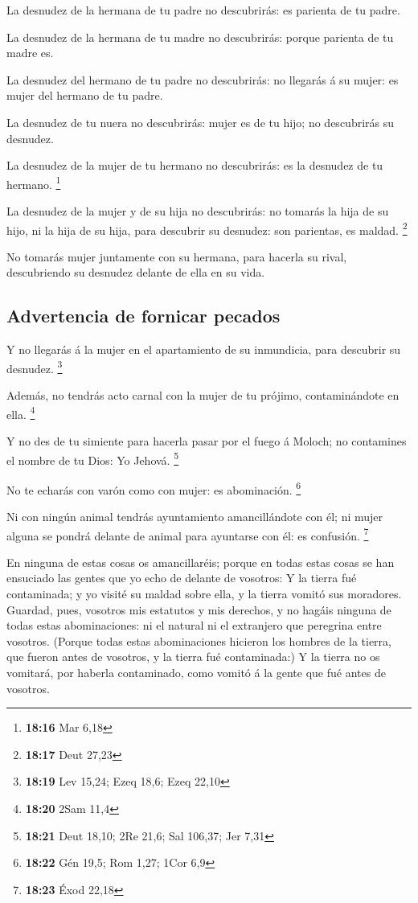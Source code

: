  La desnudez de la hermana de tu padre no descubrirás: es
parienta de tu padre.

 La desnudez de la hermana de tu madre no descubrirás:
porque parienta de tu madre es.

 La desnudez del hermano de tu padre no descubrirás: no
llegarás á su mujer: es mujer del hermano de tu padre.

 La desnudez de tu nuera no descubrirás: mujer es de tu
hijo; no descubrirás su desnudez.

 La desnudez de la mujer de tu hermano no descubrirás: es
la desnudez de tu hermano. \footnote{\textbf{18:16} Mar 6,18}

 La desnudez de la mujer y de su hija no descubrirás: no
tomarás la hija de su hijo, ni la hija de su hija, para descubrir su
desnudez: son parientas, es maldad. \footnote{\textbf{18:17} Deut 27,23}

 No tomarás mujer juntamente con su hermana, para hacerla
su rival, descubriendo su desnudez delante de ella en su vida.

\hypertarget{advertencia-de-fornicar-pecados}{%
\subsection{Advertencia de fornicar
pecados}\label{advertencia-de-fornicar-pecados}}

 Y no llegarás á la mujer en el apartamiento de su
inmundicia, para descubrir su desnudez. \footnote{\textbf{18:19} Lev
  15,24; Ezeq 18,6; Ezeq 22,10}

 Además, no tendrás acto carnal con la mujer de tu
prójimo, contaminándote en ella. \footnote{\textbf{18:20} 2Sam 11,4}

 Y no des de tu simiente para hacerla pasar por el fuego
á Moloch; no contamines el nombre de tu Dios: Yo Jehová. \footnote{\textbf{18:21}
  Deut 18,10; 2Re 21,6; Sal 106,37; Jer 7,31}

 No te echarás con varón como con mujer: es abominación.
\footnote{\textbf{18:22} Gén 19,5; Rom 1,27; 1Cor 6,9}

 Ni con ningún animal tendrás ayuntamiento amancillándote
con él; ni mujer alguna se pondrá delante de animal para ayuntarse con
él: es confusión. \footnote{\textbf{18:23} Éxod 22,18}

 En ninguna de estas cosas os amancillaréis; porque en
todas estas cosas se han ensuciado las gentes que yo echo de delante de
vosotros:  Y la tierra fué contaminada; y yo visité su
maldad sobre ella, y la tierra vomitó sus moradores. 
Guardad, pues, vosotros mis estatutos y mis derechos, y no hagáis
ninguna de todas estas abominaciones: ni el natural ni el extranjero que
peregrina entre vosotros.  (Porque todas estas
abominaciones hicieron los hombres de la tierra, que fueron antes de
vosotros, y la tierra fué contaminada:)  Y la tierra no
os vomitará, por haberla contaminado, como vomitó á la gente que fué
antes de vosotros.

